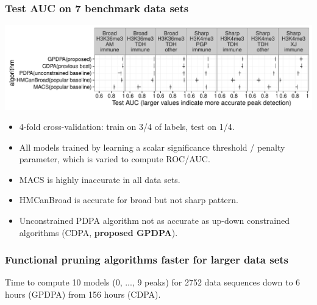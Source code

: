 \documentclass{beamer}
\begin{document}
\begin{frame}
  \frametitle{Test AUC on 7 benchmark data sets}
  \includegraphics[width=\textwidth]{figure-test-error-dots}
  \begin{itemize}
  \item 4-fold cross-validation: train on 3/4 of labels, test on 1/4.
  \item All models trained by learning a scalar significance
    threshold / penalty parameter, which is varied to compute ROC/AUC.
  \item MACS is highly inaccurate in all data sets.
  \item HMCanBroad is accurate for broad but not sharp pattern.
  \item Unconstrained PDPA algorithm not as accurate as up-down
    constrained algorithms (CDPA, \textbf{proposed GPDPA}).
  \end{itemize}
  \scriptsize
\end{frame}

\begin{frame}
  \frametitle{Functional pruning algorithms faster for larger data sets}
  

Time to compute 10 models (0, ..., 9 peaks) for 2752 data
    sequences down to \textcolor{GPDPA}{6 hours (GPDPA)} from
    \textcolor{CDPA}{156 hours (CDPA)}.
\end{frame}
\end{document}
